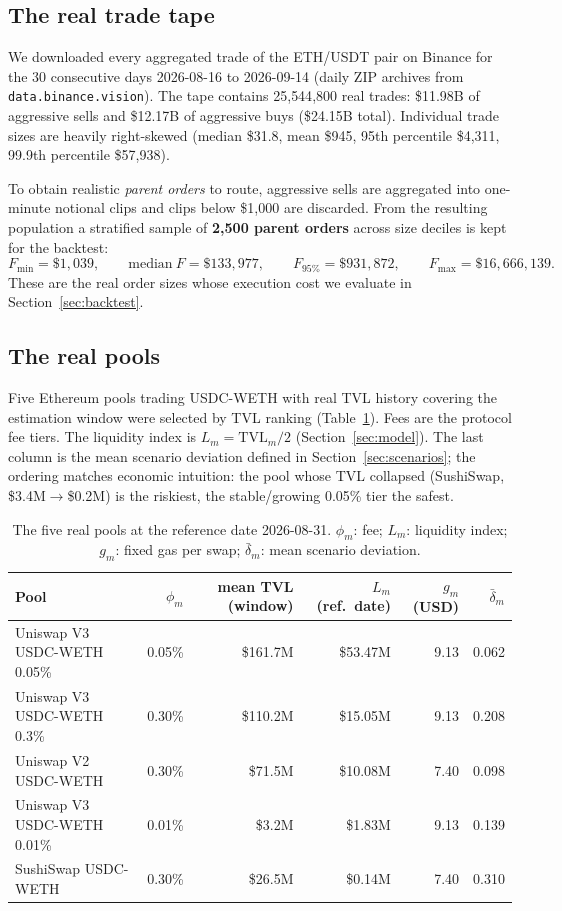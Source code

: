\documentclass[11pt,a4paper]{article}
\theoremstyle{remark}
\newcommand{\code}[1]{\texttt{#1}}
\begin{document}
\subsection{The real trade tape}

We downloaded every aggregated trade of the ETH/USDT pair on Binance for the 30 consecutive
days 2026-08-16 to 2026-09-14 (daily ZIP archives from \code{data.binance.vision}).  The
tape contains 25{,}544{,}800 real trades: \$11.98B of aggressive sells and \$12.17B of
aggressive buys (\$24.15B total).  Individual trade sizes are heavily right-skewed (median
\$31.8, mean \$945, 95th percentile \$4{,}311, 99.9th percentile \$57{,}938).

To obtain realistic \emph{parent orders} to route, aggressive sells are aggregated into
one-minute notional clips and clips below \$1{,}000 are discarded.  From the resulting
population a stratified sample of \textbf{2{,}500 parent orders} across size deciles is kept
for the backtest:
\[
  F_{\min}=\$1{,}039,\qquad \mathrm{median}\ F=\$133{,}977,\qquad
  F_{95\%}=\$931{,}872,\qquad F_{\max}=\$16{,}666{,}139.
\]
These are the real order sizes whose execution cost we evaluate in
Section~\ref{sec:backtest}.

\subsection{The real pools}

Five Ethereum pools trading USDC-WETH with real TVL history covering the estimation window
were selected by TVL ranking (Table~\ref{tab:pools}).  Fees are the protocol fee tiers.
The liquidity index is $L_m = \mathrm{TVL}_m/2$ (Section~\ref{sec:model}).  The last column
is the mean scenario deviation defined in Section~\ref{sec:scenarios}; the ordering matches
economic intuition: the pool whose TVL collapsed (SushiSwap, \$3.4M$\to$\$0.2M) is the
riskiest, the stable/growing 0.05\% tier the safest.

\begin{table}[H]
\centering
\caption{The five real pools at the reference date 2026-08-31.  $\phi_m$: fee;
$L_m$: liquidity index; $g_m$: fixed gas per swap; $\bar\delta_m$: mean scenario deviation.}
\label{tab:pools}
\small
\begin{tabular}{@{}lrrrrr@{}}
\toprule
\textbf{Pool} & $\phi_m$ & \textbf{mean TVL (window)} & $L_m$ \textbf{(ref.\ date)} &
$g_m$ \textbf{(USD)} & $\bar\delta_m$ \\
\midrule
Uniswap V3 USDC-WETH 0.05\% & 0.05\% & \$161.7M & \$53.47M & 9.13 & 0.062 \\
Uniswap V3 USDC-WETH 0.3\%  & 0.30\% & \$110.2M & \$15.05M & 9.13 & 0.208 \\
Uniswap V2 USDC-WETH        & 0.30\% &  \$71.5M & \$10.08M & 7.40 & 0.098 \\
Uniswap V3 USDC-WETH 0.01\% & 0.01\% &  \$3.2M  &  \$1.83M & 9.13 & 0.139 \\
SushiSwap USDC-WETH         & 0.30\% &  \$26.5M &  \$0.14M & 7.40 & 0.310 \\
\bottomrule
\end{tabular}
\end{table}
\end{document}
